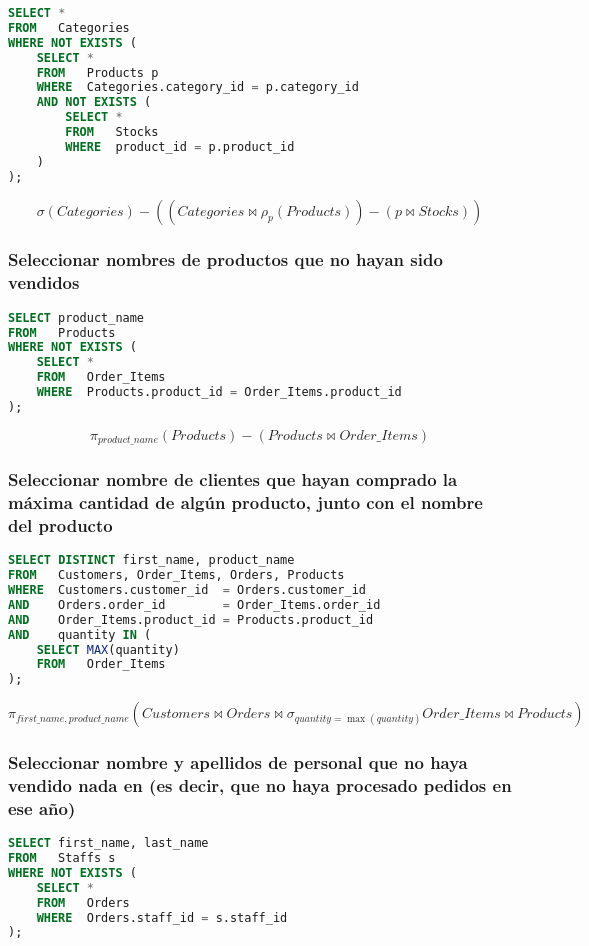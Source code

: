 \begin{lstlisting}[language=SQL]
SELECT *
FROM   Categories
WHERE NOT EXISTS (
	SELECT *
	FROM   Products p
	WHERE  Categories.category_id = p.category_id
	AND NOT EXISTS (
		SELECT *
		FROM   Stocks
		WHERE  product_id = p.product_id
	)
);
\end{lstlisting}

\[\sigma(Categories)-((Categories\bowtie\rho_p(Products))-(p\bowtie Stocks))\]

\subsubsection{Seleccionar nombres de productos que no hayan sido vendidos}

\begin{lstlisting}[language=SQL]
SELECT product_name
FROM   Products
WHERE NOT EXISTS (
	SELECT *
	FROM   Order_Items
	WHERE  Products.product_id = Order_Items.product_id
);
\end{lstlisting}

\[\pi_{product\_name}(Products)-(Products\bowtie Order\_Items)\]

\pagebreak

\subsubsection{Seleccionar nombre de clientes que hayan comprado la máxima cantidad de algún producto, junto con el nombre del producto}

\begin{lstlisting}[language=SQL]
SELECT DISTINCT first_name, product_name
FROM   Customers, Order_Items, Orders, Products
WHERE  Customers.customer_id  = Orders.customer_id
AND    Orders.order_id        = Order_Items.order_id
AND    Order_Items.product_id = Products.product_id
AND    quantity IN (
	SELECT MAX(quantity)
	FROM   Order_Items
);
\end{lstlisting}

\[\pi_{first\_name,product\_name}(Customers\bowtie Orders\bowtie\sigma_{quantity=\max(quantity)}Order\_Items\bowtie Products)\]

\subsubsection{Seleccionar nombre y apellidos de personal que no haya vendido nada en (es decir, que no haya procesado pedidos en ese año)}

\begin{lstlisting}[language=SQL]
SELECT first_name, last_name
FROM   Staffs s
WHERE NOT EXISTS (
	SELECT *
	FROM   Orders
	WHERE  Orders.staff_id = s.staff_id
);
\end{lstlisting}

